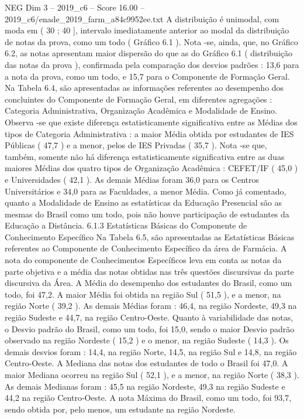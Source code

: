 \begin{textsample}{NEG Dim 3 – 2019\_c6 – Score 16.00 – 2019\_c6/enade\_2019\_farm\_a84c9952ee.txt}
A distribuição é unimodal, com moda em ( 30 ; 40 ], intervalo imediatamente anterior ao modal da distribuição de notas da prova, como um todo ( Gráfico 6.1 ).
Nota -se, ainda, que, no Gráfico 6.2, as notas apresentam maior dispersão do que as do Gráfico 6.1 ( distribuição das notas da prova ), confirmada pela comparação dos desvios padrões : 13,6 para a nota da prova, como um todo, e 15,7 para o Componente de Formação Geral.
Na Tabela 6.4, são apresentadas as informações referentes ao desempenho dos concluintes do Componente de Formação Geral, em diferentes agregações : Categoria Administrativa, Organização Acadêmica e Modalidade de Ensino.
Observa -se que existe diferença estatisticamente significativa entre as Médias dos tipos de Categoria Administrativa : a maior Média obtida por estudantes de IES Públicas ( 47,7 ) e a menor, pelos de IES Privadas ( 35,7 ).
Nota -se que, também, somente não há diferença estatisticamente significativa entre as duas maiores Médias dos quatro tipos de Organização Acadêmica : CEFET/IF ( 45,0 ) e Universidades ( 42,1 ).
As demais Médias foram 36,0 para os Centros Universitários e 34,0 para as Faculdades, a menor Média.
Como já comentado, quanto a Modalidade de Ensino as estatísticas da Educação Presencial são as mesmas do Brasil como um todo, pois não houve participação de estudantes da Educação a Distância. 6.1.3 Estatísticas Básicas do Componente de Conhecimento Específico Na Tabela 6.5, são apresentadas as Estatísticas Básicas referentes ao Componente de Conhecimento Específico da área de Farmácia.
A nota do componente de Conhecimentos Específicos leva em conta as notas da parte objetiva e a média das notas obtidas nas três questões discursivas da parte discursiva da Área.
A Média do desempenho dos estudantes do Brasil, como um todo, foi 47,2.
A maior Média foi obtida na região Sul ( 51,5 ), e a menor, na região Norte ( 39,2 ).
As demais Médias foram : 46,4, na região Nordeste, 49,3 na região Sudeste e 44,7, na região Centro-Oeste.
Quanto à variabilidade das notas, o Desvio padrão do Brasil, como um todo, foi 15,0, sendo o maior Desvio padrão observado na região Nordeste ( 15,2 ) e o menor, na região Sudeste ( 14,3 ).
Os demais desvios foram : 14,4, na região Norte, 14,5, na região Sul e 14,8, na região Centro-Oeste.
A Mediana das notas dos estudantes de todo o Brasil foi 47,0.
A maior Mediana ocorreu na região Sul ( 52,1 ), e a menor, na região Norte ( 38,3 ).
As demais Medianas foram : 45,5 na região Nordeste, 49,3 na região Sudeste e 44,2 na região Centro-Oeste.
A nota Máxima do Brasil, como um todo, foi 93,7, sendo obtida por, pelo menos, um estudante na região Nordeste.

\end{textsample}

